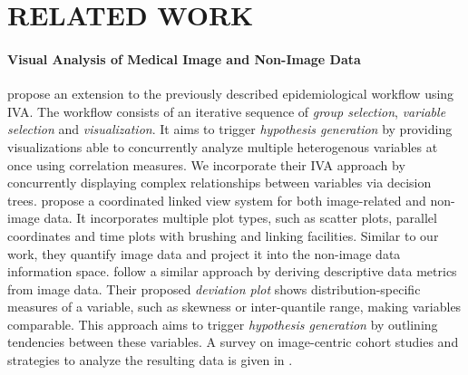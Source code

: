 \documentclass[a4paper,twoside]{style/article}
\begin{document}
\section{\uppercase{Related Work}}
\label{sec:RelatedWork}
\paragraph{Visual Analysis of Medical Image and Non-Image Data}
\cite{Klemm2014VIS} propose an extension to the previously described epidemiological workflow using IVA.
The workflow consists of an iterative sequence of \emph{group selection}, \emph{variable selection} and \emph{visualization}.
It aims to trigger \emph{hypothesis generation} by providing visualizations able to concurrently analyze multiple heterogenous variables at once using correlation measures.
We incorporate their IVA approach by concurrently displaying complex relationships between variables via decision trees.
\cite{Steenwijk} propose a coordinated linked view system for both image-related and non-image data.
It incorporates multiple plot types, such as scatter plots, parallel coordinates and time plots with brushing and linking facilities.
Similar to our work, they quantify image data and project it into the non-image data information space.
\cite{Turkay} follow a similar approach by deriving descriptive data metrics from image data.
Their proposed \emph{deviation plot} shows distribution-specific measures of a variable, such as skewness or inter-quantile range, making variables comparable.
This approach aims to trigger \emph{hypothesis generation} by outlining tendencies between these variables.
A survey on image-centric cohort studies and strategies to analyze the resulting data is given in \cite{Preim2014}.
\end{document}
